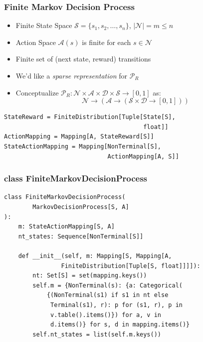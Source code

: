 \documentclass[handout]{beamer}
\begin{document}
\begin{frame}[fragile]
\frametitle{Finite Markov Decision Process}
\pause
\begin{itemize}[<+->]
\item Finite State Space $\mathcal{S} = \{s_1, s_2, \ldots, s_n\}$, $|\mathcal{N}| = m\leq n$
\item Action Space $\mathcal{A}(s)$ is finite for each $s \in \mathcal{N}$
\item Finite set of (next state, reward) transitions
\item We'd like a {\em sparse representation} for $\mathcal{P}_R$
\item Conceptualize $\mathcal{P}_R : \mathcal{N} \times \mathcal{A} \times \mathcal{D} \times \mathcal{S} \rightarrow [0, 1]$ as:
$$\mathcal{N} \rightarrow (\mathcal{A} \rightarrow (\mathcal{S} \times \mathcal{D} \rightarrow [0, 1]))$$
\end{itemize}
\pause
\begin{lstlisting}
StateReward = FiniteDistribution[Tuple[State[S],
                                       float]]
ActionMapping = Mapping[A, StateReward[S]]
StateActionMapping = Mapping[NonTerminal[S], 
                             ActionMapping[A, S]]
\end{lstlisting}
\end{frame}


\begin{frame}[fragile]
\frametitle{class FiniteMarkovDecisionProcess}
\pause
\begin{lstlisting}
class FiniteMarkovDecisionProcess(
        MarkovDecisionProcess[S, A]
):
    m: StateActionMapping[S, A]
    nt_states: Sequence[NonTerminal[S]]

    def __init__(self, m: Mapping[S, Mapping[A, 
                FiniteDistribution[Tuple[S, float]]]]):
        nt: Set[S] = set(mapping.keys())
        self.m = {NonTerminal(s): {a: Categorical(
            {(NonTerminal(s1) if s1 in nt else
             Terminal(s1), r): p for (s1, r), p in
             v.table().items()}) for a, v in
             d.items()} for s, d in mapping.items()}
        self.nt_states = list(self.m.keys())

                      
\end{lstlisting}                                    
\end{frame}
\end{document}

